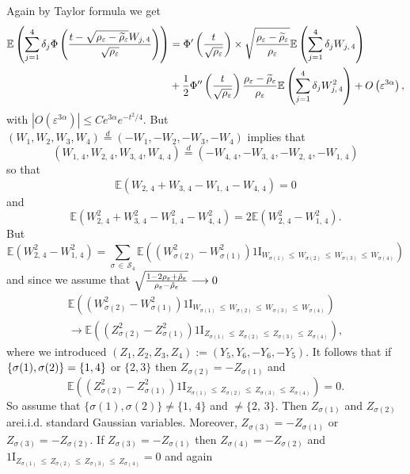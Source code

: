 \documentclass[AHL,Unicode,longabstracts,published]{cedram}
\newcommand{\E}{\mathbb{E}}
\newcommand{\ind}{{1\!\!\mathrm{I}}}
\newcommand{\eps}{\varepsilon}
\newcommand{\calS}{\mathcal{S}}
\let\oldtilde\tilde
\renewcommand*{\tilde}[1]{\mathchoice{\widetilde{#1}}{\widetilde{#1}}{\oldtilde{#1}}{\oldtilde{#1}}}
\begin{document}
Again by Taylor formula we get
\begin{align*}
\E\left(\sum_{j=1}^{4}\delta_j
\Phi\left(\frac{t-\sqrt{\rho_\eps-\tilde{\rho}_\eps}W_{j,\,4}}{\sqrt{\rho_\eps}}\right)\right)&=
\Phi'\left(\frac{t}{\sqrt{\rho_\eps}}\right)\times \sqrt{\frac{\rho_\eps-\tilde{\rho}_\eps}{\rho_\eps}}\E\left(\sum_{j=1}^{4}\delta_j W_{j,\,4}\right)\\
&+\frac{1}{2}\Phi''\left(\frac{t}{\sqrt{\rho_\eps}}\right)\frac{\rho_\eps-\tilde{\rho}_\eps}{\rho_\eps}\E\left(\sum_{j=1}^{4}\delta_j W_{j,\,4}^2\right)+O\left(\eps^{3\alpha}\right),
\end{align*}
with $|O(\eps^{3\alpha})|\le Ce^{3\alpha}e^{-t^2/4}$. But $(W_1,W_2,W_3,W_4)\stackrel{d}{=}(-W_1,-W_2,-W_3,-W_4)$ implies that
\[
\left(W_{1,\,4},W_{2,\,4},W_{3,\,4},W_{4,\,4}\right)\stackrel{d}{=}\left(-W_{4,\,4},-W_{3,\,4},-W_{2,\,4},-W_{1,\,4}\right)
\]
so that
\[
\E\left(W_{2,\,4}+W_{3,\,4}-W_{1,\,4}-W_{4,\,4}\right)=0
\]
and
\[
\E\left(W_{2,\,4}^2+W_{3,\,4}^2-W_{1,\,4}^2-W_{4,\,4}^2\right)=2\E\left(W_{2,\,4}^2-W_{1,\,4}^2\right).
\]
But
\[
\E\left(W_{2,\,4}^2-W_{1,\,4}^2\right)=\sum_{\sigma\,\in\,\calS_4}
\E\left(\left(W_{\sigma(2)}^2-W_{\sigma(1)}^2\right)\ind_{W_{\sigma(1)}\,\le\,W_{\sigma(2)}\,\le\,W_{\sigma(3)}\,\le\,W_{\sigma(4)}}\right)
\]
and since we assume that $\sqrt{\frac{1-2\rho_\eps+\tilde{\rho}_\eps}{\rho_\eps-\tilde{\rho}_\eps}}\longrightarrow 0$
\begin{multline*}
\E\left(\left(W_{\sigma(2)}^2-W_{\sigma(1)}^2\right)\ind_{W_{\sigma(1)}\,\le\,W_{\sigma(2)}\,\le\,W_{\sigma(3)}\,\le\,W_{\sigma(4)}}\right)\\
\longrightarrow \E\left(\left(Z_{\sigma(2)}^2-Z_{\sigma(1)}^2\right)\ind_{Z_{\sigma(1)}\,\le\, Z_{\sigma(2)}\,\le\,Z_{\sigma(3)}\,\le\, Z_{\sigma(4)}}\right),
\end{multline*}
where we introduced $(Z_1,Z_2,Z_3,Z_4):=(Y_5,Y_6,-Y_6,-Y_5)$. It follows that if $\{\sigma(1),\linebreak\sigma(2)\}=\{1,4\}$ or $\{2,3\}$ then $Z_{\sigma(2)} =-Z_{\sigma(1)}$ and
\[
\E\left(\left(Z_{\sigma(2)}^2-Z_{\sigma(1)}^2\right)\ind_{Z_{\sigma(1)}\,\le\,Z_{\sigma(2)}\,\le\,Z_{\sigma(3)}\,\le\,Z_{\sigma(4)}}\right)=0.
\]
So assume that $\{\sigma(1),\sigma(2)\}\neq \{1,\,4\}$ and $\neq \{2,\,3\}$. Then $Z_{\sigma(1)}$ and $Z_{\sigma(2)}$ are\linebreak i.i.d. standard Gaussian variables. Moreover, $Z_{\sigma(3)}=-Z_{\sigma(1)}$ or $Z_{\sigma(3)}=-Z_{\sigma(2)}$. If $Z_{\sigma(3)}=-Z_{\sigma(1)}$ then $Z_{\sigma(4)}=-Z_{\sigma(2)}$ and $\ind_{Z_{\sigma(1)}\,\le\,Z_{\sigma(2)}\,\le\, Z_{\sigma(3)}\,\le\,Z_{\sigma(4)}}=0$ and again
\end{document}
